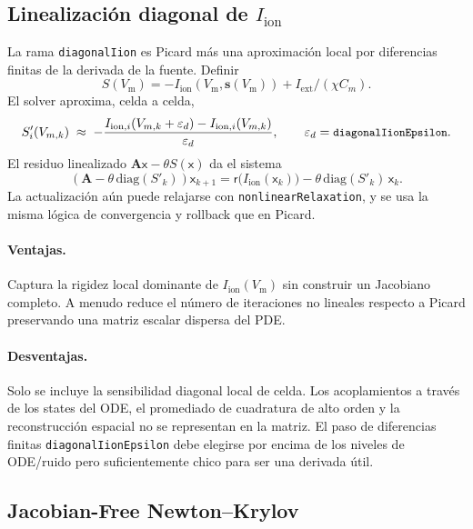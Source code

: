 \documentclass[11pt,a4paper]{article}
\newcommand{\code}[1]{\texttt{\small #1}}
\newcommand{\Vm}{V_{\text{m}}}
\newcommand{\Iion}{I_{\mathrm{ion}}}
\newcommand{\Aimp}{\mathbf{A}}
\newcommand{\Iext}{I_{\mathrm{ext}}}
\begin{document}
\subsection{Linealización diagonal de \texorpdfstring{$\Iion$}{Iion}}

La rama \code{diagonalIion} es Picard más una aproximación local por diferencias
finitas de la derivada de la fuente. Definir
\[
  S(\Vm) = -\Iion(\Vm,\mathbf{s}(\Vm)) + \Iext/(\chi C_m).
\]
El solver aproxima, celda a celda,
\begin{equation}
  S'_i(V_{m,k})
  \;\approx\;
  -\frac{
      I_{\mathrm{ion},i}(V_{m,k}+\varepsilon_d)
      - I_{\mathrm{ion},i}(V_{m,k})
    }{\varepsilon_d},
  \qquad
  \varepsilon_d=\code{diagonalIionEpsilon}.
\end{equation}
El residuo linealizado $\Aimp\mathsf{x}-\theta S(\mathsf{x})$ da el sistema
\begin{equation}
  \left(\Aimp-\theta\,\mathrm{diag}(S'_k)\right)\mathsf{x}_{k+1}
  =
  \mathsf{r}\!\bigl(\Iion(\mathsf{x}_{k})\bigr)
  - \theta\,\mathrm{diag}(S'_k)\,\mathsf{x}_{k}.
  \label{eq:diagonalIion}
\end{equation}
La actualización aún puede relajarse con \code{nonlinearRelaxation}, y se usa la
misma lógica de convergencia y rollback que en Picard.

\paragraph{Ventajas.}
Captura la rigidez local dominante de $\Iion(\Vm)$ sin construir un Jacobiano
completo. A menudo reduce el número de iteraciones no lineales respecto a Picard
preservando una matriz escalar dispersa del PDE.

\paragraph{Desventajas.}
Solo se incluye la sensibilidad diagonal local de celda. Los acoplamientos a través
de los states del ODE, el promediado de cuadratura de alto orden y la
reconstrucción espacial no se representan en la matriz. El paso de diferencias
finitas \code{diagonalIionEpsilon} debe elegirse por encima de los niveles de
ODE/ruido pero suficientemente chico para ser una derivada útil.

\subsection{Jacobian-Free Newton--Krylov}
\end{document}
